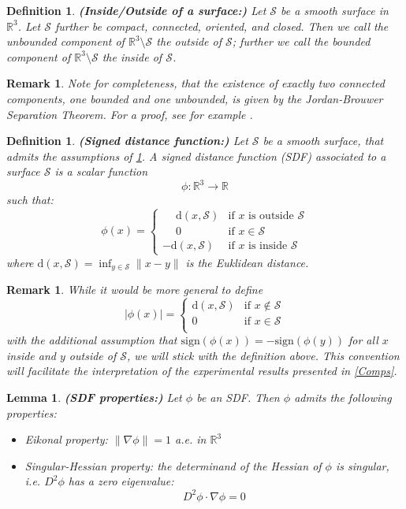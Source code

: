 \documentclass[12pt,openany]{book}
\newcommand{\R}{\mathbb{R}}
\def\S{\mathcal{S}}
\theoremstyle{plainnormal}
\newtheorem{lemma}[theorem]{Lemma}
\newtheorem{definition}[theorem]{Definition}
\newtheorem{remark}[theorem]{Remark}
\theoremstyle{remark}
\begin{document}
\begin{definition}\label{defInsOuts}\textbf{(Inside/Outside of a surface:)}
    Let $\S$ be a smooth surface in $\R^3$. Let $\S$ further be compact, connected, oriented, and closed. Then we call the unbounded component of $\R^3\setminus \S$ the \emph{outside} of $\S$; further we call the bounded component of $\R^3\setminus \S$ the \emph{inside} of $\S$.
\end{definition}
\begin{remark}
    Note for completeness, that the existence of exactly two connected components, one bounded and one unbounded, is given by the \emph{Jordan-Brouwer Separation Theorem}. For a proof, see for example \cite{Lima01011988}. 
\end{remark}
\begin{definition}\textbf{(Signed distance function:)}
    Let $\S$ be a smooth surface, that admits the assumptions of \cref{defInsOuts}. A \emph{signed distance function} (SDF) associated to a surface $\S$ is a scalar function 
    $$\phi: \R^3 \rightarrow \R$$
    such that:
    $$\phi(x) = 
\begin{cases}
\phantom{-}\mathrm{d}(x, \S) & \text{if } x \text{ is outside } \S \\
\phantom{-} 0 & \text{if } x \in \S \\
-\mathrm{d}(x, \S) & \text{if } x \text{ is inside } \S
\end{cases} $$
    where $\mathrm{d} (x, \S)= \inf_{y\in \S} \|x - y\|$ is the Euklidean distance.
\end{definition}
    \begin{remark}
        While it would be more general to define
    $$|\phi(x)| = 
\begin{cases}
\mathrm{d}(x, \S) & \text{if } x \notin \S \\
0 & \text{if } x \in \S \\
\end{cases}$$
with the additional assumption that 
$\mathrm{sign}(\phi(x)) = - \mathrm{sign}(\phi (y))$ for all $x$ inside and $y$ outside of $\S$, we will stick with the definition above. This convention will facilitate the interpretation of the experimental results presented in \cref{Comps}.
    \end{remark}
\begin{lemma}\label{singHess} \textbf{(SDF properties:)}
    Let $\phi$ be an SDF. Then $\phi$ admits the following properties:
    \begin{itemize}
        \item \emph{Eikonal property}:  $\|\nabla \phi\| = 1 $ a.e. in $\R^3$ 
        \item \emph{Singular-Hessian property:}  the determinand of the Hessian of $\phi$ is singular, i.e.  $D^2 \phi$ has a zero eigenvalue:
        $$D^2 \phi \cdot\nabla \phi = 0$$
    
    \end{itemize}
\end{lemma}
\end{document}
